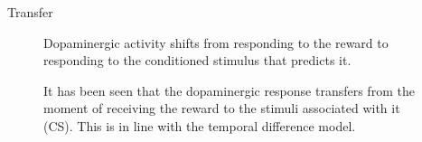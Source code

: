 \begin{description}
\begin{description}


            \item[Transfer] 
                Dopaminergic activity shifts from responding to the reward to responding to the conditioned stimulus that predicts it.

                \begin{casestudy}
                    It has been seen that the dopaminergic response transfers from the moment of receiving the reward to the stimuli associated with it (CS).
                    This is in line with the temporal difference model. 


\end{casestudy}
\end{description}
\end{description}
